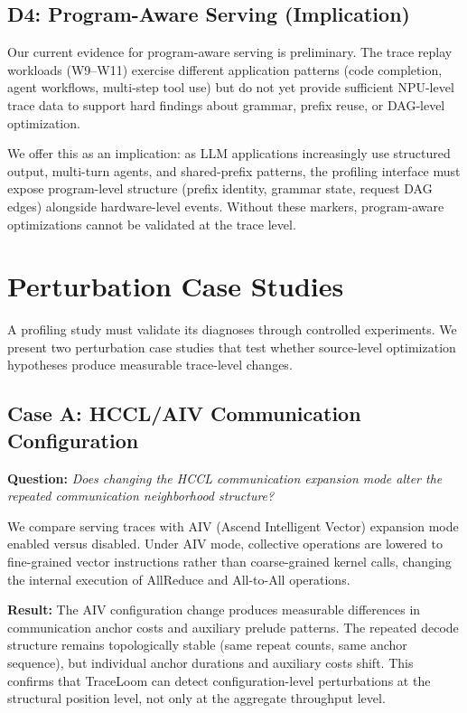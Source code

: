 \documentclass[conference]{IEEEtran}
\begin{document}
\subsection{D4: Program-Aware Serving (Implication)}
\label{sec:program-aware}

Our current evidence for program-aware serving is preliminary. The trace
replay workloads (W9--W11) exercise different application patterns
(code completion, agent workflows, multi-step tool use) but do not yet
provide sufficient NPU-level trace data to support hard findings about
grammar, prefix reuse, or DAG-level optimization.

We offer this as an implication: as LLM applications increasingly use
structured output, multi-turn agents, and shared-prefix patterns, the
profiling interface must expose program-level structure (prefix identity,
grammar state, request DAG edges) alongside hardware-level events. Without
these markers, program-aware optimizations cannot be validated at the trace
level.


\section{Perturbation Case Studies}
\label{sec:perturbation}

A profiling study must validate its diagnoses through controlled experiments.
We present two perturbation case studies that test whether source-level
optimization hypotheses produce measurable trace-level changes.

\subsection{Case A: HCCL/AIV Communication Configuration}

\textbf{Question:} \emph{Does changing the HCCL communication expansion mode
alter the repeated communication neighborhood structure?}

We compare serving traces with AIV (Ascend Intelligent Vector) expansion mode
enabled versus disabled. Under AIV mode, collective operations are lowered to
fine-grained vector instructions rather than coarse-grained kernel calls,
changing the internal execution of AllReduce and All-to-All operations.

\textbf{Result:} The AIV configuration change produces measurable differences
in communication anchor costs and auxiliary prelude patterns. The repeated
decode structure remains topologically stable (same repeat counts, same anchor
sequence), but individual anchor durations and auxiliary costs shift. This
confirms that TraceLoom can detect configuration-level perturbations at the
structural position level, not only at the aggregate throughput level.
\end{document}
